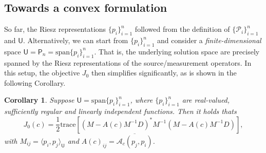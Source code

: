 \documentclass[12pt]{amsart}
\newtheorem{cor}{Corollary}
\begin{document}
\subsection{Towards a convex formulation}
So far, the Riesz representations $\{p_i\}_{i=1}^n$ followed from the definition of $\{\mathcal{P}_i\}_{i=1}^n$ and $\mathsf{U}$. Alternatively, we can start from $\{p_i\}_{i=1}^n$ and consider a \emph{finite-dimensional} space $\mathsf{U} = \mathsf{P}_n = \text{span}\{p_i\}_{i=1}^n$. That is, the underlying solution space are precisely spanned by the Riesz representations of the source/measurement operators. In this setup, the objective $J_0$ then simplifies significantly, as is shown in the following Corollary.
\begin{cor}
\label{thm:quadratic}
Suppose $\mathsf{U} = \text{span}\{p_i\}_{i=1}^n$, where $\{p_i\}_{i=1}^n$ are real-valued, sufficiently regular and linearly independent functions. Then it holds thats
\begin{equation}
J_{0}(c) =  {\textstyle\frac{1}{2}}\text{trace}\left[\left(M - A(c)M^{-1}D\right)^*M^{-1}\left(M - A(c)M^{-1}D\right)\right],
\end{equation}
with $M_{ij} = \langle p_i, p_j \rangle_{\mathsf{U}}$ and $A(c)_{ij} = \overline{\mathcal{A}_c(p_j, p_i)}$.
\end{cor}
\end{document}
